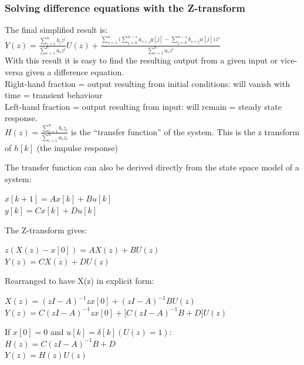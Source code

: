 \begin{frame}
	\frametitle{Solving difference equations with the Z-transform}
	\footnotesize{The final simplified result is:\\
		$Y(z) = \frac{\sum\limits_{i=1}^{n} b_i z^i}{\sum\limits_{i=1}^{n} a_i z^i} U(z) + \frac{\sum\limits_{s=1}^{n}\Bigg(\sum\limits_{j=0}^{n-s}a_{s+j}y[j]-\sum\limits_{j=0}^{n-s}b_{s+j}u[j]\Bigg)	z^{s}}{\sum\limits_{i=1}^{n} a_i z^{i}}$\\
		With this result it is easy to find the resulting output from a given input or vice-versa given a difference equation.\\
		Right-hand fraction = output resulting from initial conditions: will vanish with time = transient behaviour\\
		Left-hand fraction = output resulting from input: will remain = steady state response. \\
		$ H(z) = \frac{\sum\limits_{i=1}^{n} b_i z_i}{\sum\limits_{i=1}^{n} a_i z_i}$ is the “transfer function” of the system. This is the z transform of $h[k]$ (the impulse response)}
		
\end{frame}
\begin{frame}
	\footnotesize{
	The transfer function can also be derived directly from the state space model of a system:\\
	\vspace{-1.5em}
	\begin{center}
		$x[k+1] = Ax[k] + Bu[k] $\\
		$y[k] = Cx[k]+Du[k]$
	\end{center}
	\vspace{-1.5em}
	The Z-transform gives:
	\begin{center}
		$z(X(z)-x[0]) = AX(z)+BU(z)$\\
		$Y(z) = CX(z)+DU(z)$
	\end{center}
	Rearranged to have X(z) in explicit form:
	\begin{center}
		$X(z) = (zI-A)^{-1}zx[0] + (zI-A)^{-1}BU(z) $\\
		$Y(z) = C(zI-A)^{-1}zx[0] + \bigg[C(zI-A)^{-1}B + D\bigg]U(z)$
	\end{center}
	If $x[0] = 0$ and $u[k] = \delta[k] (U(z)=1)$:\\
	$H(z) = C(zI-A)^{-1}B + D$\\
	$Y(z)=H(z)U(z)$}
\end{frame}
